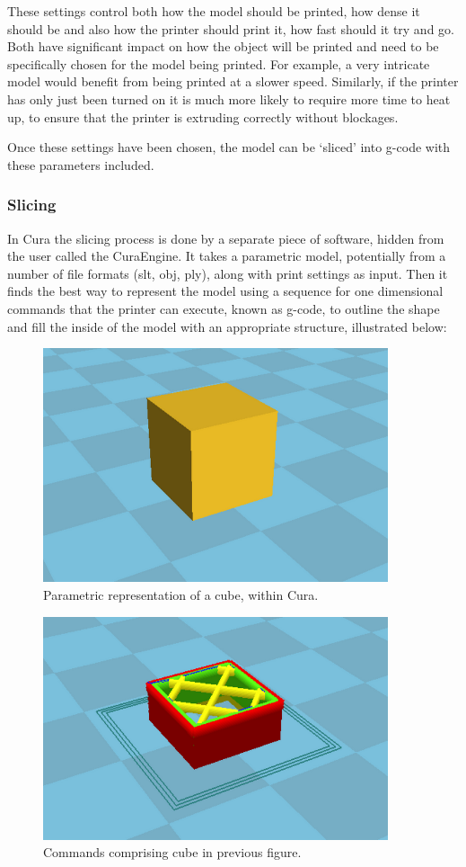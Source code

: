 \documentclass[11pt]{report} %
\begin{document}
These settings control both how the model should be printed, how dense it should be and also how the printer should print it, how fast should it try and go. Both have significant impact on how the object will be printed and need to be specifically chosen for the model being printed. For example, a very intricate model would benefit from being printed at a slower speed. Similarly, if the printer has only just been turned on it is much more likely to require more time to heat up, to ensure that the printer is extruding correctly without blockages.

Once these settings have been chosen, the model can be `sliced' into g-code with these parameters included.

\subsubsection{Slicing}
In Cura the slicing process is done by a separate piece of software, hidden from the user called the CuraEngine. It takes a parametric model, potentially from a number of file formats (slt, obj, ply), along with print settings as input. Then it finds the best way to represent the model using a sequence for one dimensional commands that the printer can execute, known as g-code, to outline the shape and fill the inside of the model with an appropriate structure, illustrated below:

\begin{figure}[H]
  \centering
  \includegraphics[width=4in]{james_cura_top_fig.png}
  \caption{Parametric representation of a cube, within Cura.}
  \label{figure:JCtop}
\end{figure}

\begin{figure}[H]
  \centering
  \includegraphics[width=4in]{james_cura_bottom_fig.png}
  \caption{Commands comprising cube in previous figure.}
  \label{figure:JCbottom}
\end{figure}
\end{document}
